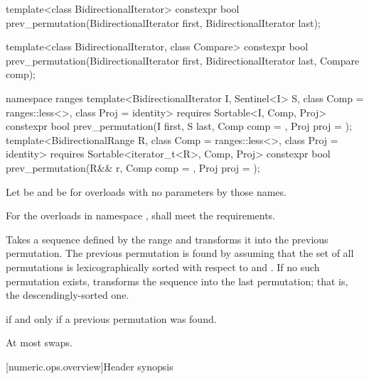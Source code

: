 %
\begin{itemdecl}
template<class BidirectionalIterator>
  constexpr bool prev_permutation(BidirectionalIterator first,
                                  BidirectionalIterator last);

template<class BidirectionalIterator, class Compare>
  constexpr bool prev_permutation(BidirectionalIterator first,
                                  BidirectionalIterator last, Compare comp);

namespace ranges {
  template<BidirectionalIterator I, Sentinel<I> S, class Comp = ranges::less<>,
           class Proj = identity>
    requires Sortable<I, Comp, Proj>
    constexpr bool
      prev_permutation(I first, S last, Comp comp = {}, Proj proj = {});
  template<BidirectionalRange R, class Comp = ranges::less<>,
           class Proj = identity>
    requires Sortable<iterator_t<R>, Comp, Proj>
    constexpr bool
      prev_permutation(R&& r, Comp comp = {}, Proj proj = {});
}
\end{itemdecl}

\begin{itemdescr}
\pnum
Let  be 
and  be 
for overloads with no parameters by those names.

\pnum
\requires
For the overloads in namespace ,
 shall meet
the  requirements.

\pnum
\effects
Takes a sequence defined by the range 
and transforms it into the previous permutation.
The previous permutation is found by assuming that the set of all permutations
is lexicographically sorted with respect to  and .
If no such permutation exists,
transforms the sequence into the last permutation;
that is, the descendingly-sorted one.

\pnum
\returns
{} if and only if a previous permutation was found.

\pnum
\complexity
At most  swaps.
\end{itemdescr}

[numeric.ops.overview]{Header  synopsis}

